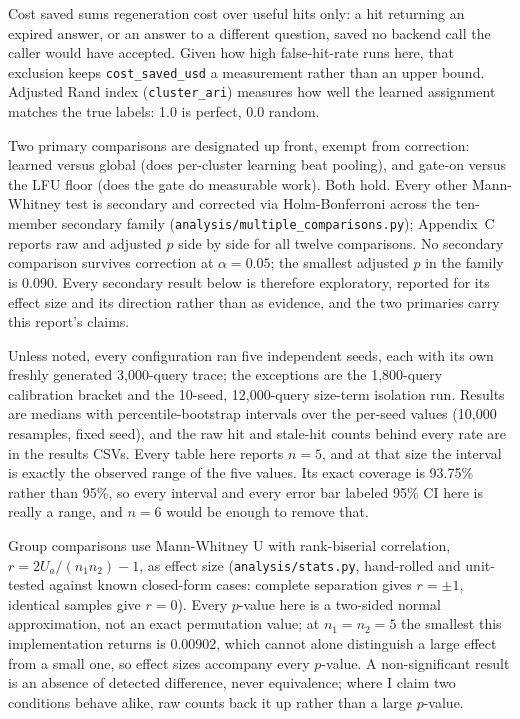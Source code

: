 \documentclass[10pt]{article}
\begin{document}
Cost saved sums regeneration cost over useful hits only: a hit returning an expired answer,
or an answer to a different question, saved no backend call the caller would have accepted.
Given how high false-hit-rate runs here, that exclusion keeps \texttt{cost\_saved\_usd} a
measurement rather than an upper bound. Adjusted Rand index (\texttt{cluster\_ari}) measures
how well the learned assignment matches the true labels: 1.0 is perfect, 0.0 random.

Two primary comparisons are designated up front, exempt from correction: learned versus
global (does per-cluster learning beat pooling), and gate-on versus the LFU floor (does the
gate do measurable work). Both hold. Every other Mann-Whitney test is secondary and
corrected via Holm-Bonferroni across the ten-member secondary family
(\texttt{analysis/\allowbreak multiple\_comparisons.py}); Appendix~C reports raw and
adjusted $p$ side by side for all twelve comparisons. No secondary comparison survives
correction at $\alpha = 0.05$; the smallest adjusted $p$ in the family is 0.090. Every
secondary result below is therefore exploratory, reported for its effect size and its
direction rather than as evidence, and the two primaries carry this report's claims.

Unless noted, every configuration ran five independent seeds, each with its own freshly
generated 3{,}000-query trace; the exceptions are the 1{,}800-query calibration bracket and
the 10-seed, 12{,}000-query size-term isolation run. Results are medians with percentile-bootstrap intervals over the
per-seed values (10{,}000 resamples, fixed seed), and the raw hit and stale-hit counts
behind every rate are in the results CSVs. Every table here reports $n = 5$, and at that size
the interval is exactly the observed range of the five values. Its exact coverage is 93.75\%
rather than 95\%, so every interval and every error bar labeled 95\% CI here is really a
range, and $n = 6$ would be enough to remove that.

Group comparisons use Mann-Whitney U with rank-biserial correlation,
$r = 2 U_a/(n_1 n_2) - 1$, as effect size (\texttt{analysis/stats.py}, hand-rolled and
unit-tested against known closed-form cases: complete separation gives $r=\pm1$, identical
samples give $r=0$). Every
$p$-value here is a two-sided normal approximation, not an exact permutation value; at
$n_1 = n_2 = 5$ the smallest this implementation returns is 0.00902, which cannot alone
distinguish a large effect from a small one, so effect sizes accompany every $p$-value. A
non-significant result is an absence of detected difference, never equivalence; where I claim
two conditions behave alike, raw counts back it up rather than a large $p$-value.
\end{document}
